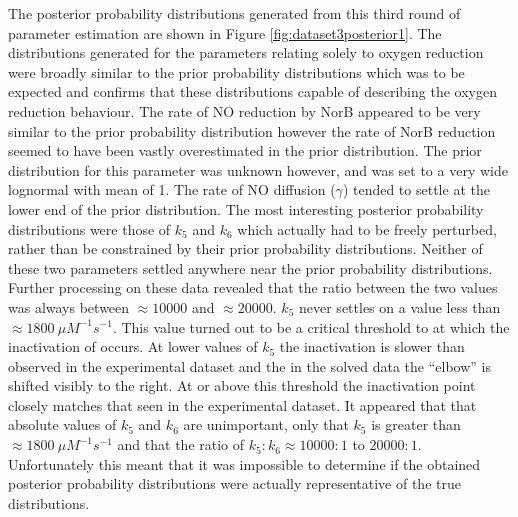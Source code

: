 The posterior probability distributions generated from this third round of parameter estimation are shown in Figure \ref{fig:dataset3posterior1}. The distributions generated for the parameters relating solely to oxygen reduction were broadly similar to the prior probability distributions which was to be expected and confirms that these distributions capable of describing the oxygen reduction behaviour. The rate of NO reduction by NorB appeared to be very similar to the prior probability distribution however the rate of NorB reduction seemed to have been vastly overestimated in the prior distribution. The prior distribution for this parameter was unknown however, and was set to a very wide lognormal with mean of 1. The rate of NO diffusion ($\gamma$) tended to settle at the lower end of the prior distribution. The most interesting posterior probability distributions were those of $k_5$ and $k_6$ which actually had to be freely perturbed, rather than be constrained by their prior probability distributions. Neither of these two parameters settled anywhere near the prior probability distributions. Further processing on these data revealed that the ratio between the two values was always between $\approx 10000$ and $\approx 20000$. $k_5$ never settles on a value less than $\approx 1800~\mu M^{-1}s^{-1}$. This value turned out to be a critical threshold to at which the inactivation of \cbbthree{} occurs. At lower values of $k_5$ the inactivation is slower than observed in the experimental dataset and the in the solved data the ``elbow'' is shifted visibly to the right. At or above this threshold the inactivation point closely matches that seen in the experimental dataset. It appeared that that absolute values of $k_5$ and $k_6$ are unimportant, only that $k_5$ is greater than $\approx 1800~\mu M^{-1}s^{-1}$ and that the ratio of $k_5:k_6 \approx 10000:1$ to $20000:1$. Unfortunately this meant that it was impossible to determine if the obtained posterior probability distributions were actually representative of the true distributions.

